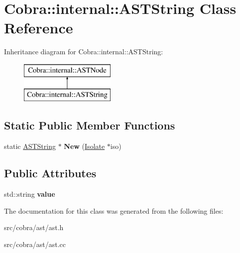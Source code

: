 \hypertarget{class_cobra_1_1internal_1_1_a_s_t_string}{\section{Cobra\+:\+:internal\+:\+:A\+S\+T\+String Class Reference}
\label{class_cobra_1_1internal_1_1_a_s_t_string}
}
Inheritance diagram for Cobra\+:\+:internal\+:\+:A\+S\+T\+String\+:\begin{figure}[H]
\begin{center}
\leavevmode
\includegraphics[height=2.000000cm]{class_cobra_1_1internal_1_1_a_s_t_string}
\end{center}
\end{figure}
\subsection*{Static Public Member Functions}
\begin{DoxyCompactItemize}
\item 
\hypertarget{class_cobra_1_1internal_1_1_a_s_t_string_a47d3c66647adfd08907f4480bb72800f}{static \hyperlink{class_cobra_1_1internal_1_1_a_s_t_string}{A\+S\+T\+String} $\ast$ {\bfseries New} (\hyperlink{class_cobra_1_1internal_1_1_isolate}{Isolate} $\ast$iso)}\label{class_cobra_1_1internal_1_1_a_s_t_string_a47d3c66647adfd08907f4480bb72800f}

\end{DoxyCompactItemize}
\subsection*{Public Attributes}
\begin{DoxyCompactItemize}
\item 
\hypertarget{class_cobra_1_1internal_1_1_a_s_t_string_a91fd89c1cf9442e5df35d19e6fe6a465}{std\+::string {\bfseries value}}\label{class_cobra_1_1internal_1_1_a_s_t_string_a91fd89c1cf9442e5df35d19e6fe6a465}

\end{DoxyCompactItemize}


The documentation for this class was generated from the following files\+:\begin{DoxyCompactItemize}
\item 
src/cobra/ast/ast.\+h\item 
src/cobra/ast/ast.\+cc\end{DoxyCompactItemize}
